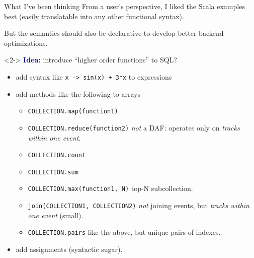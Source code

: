 \documentclass{beamer}
\begin{document}
\begin{frame}{What I've been thinking}
\vspace{0.25 cm}
From a user's perspective, I liked the Scala examples best (easily translatable into any other functional syntax).

\vspace{0.25 cm}
But the semantics should also be declarative to develop better backend optimizations.

\vspace{0.25 cm}
\begin{uncoverenv}<2->
\textcolor{darkblue}{\bf Idea:} introduce ``higher order functions'' to SQL?
\begin{itemize}
\item add syntax like {\tt x -> sin(x) + 3*x} to expressions
\item add methods like the following to arrays
\begin{itemize}
\item {\tt \scriptsize COLLECTION.map(function1)}
\item {\tt \scriptsize COLLECTION.reduce(function2)} {\it not} a DAF: operates only on {\it tracks within one event}.
\item {\tt \scriptsize COLLECTION.count}
\item {\tt \scriptsize COLLECTION.sum}
\item {\tt \scriptsize COLLECTION.max(function1, N)} top-N subcollection.
\item {\tt \scriptsize join(COLLECTION1, COLLECTION2)} {\it not} joining events, but {\it tracks within one event} (small).
\item {\tt \scriptsize COLLECTION.pairs} like the above, but unique pairs of indexes.
\end{itemize}
\item add assignments (syntactic sugar).
\end{itemize}
\end{uncoverenv}
\end{frame}
\end{document}
